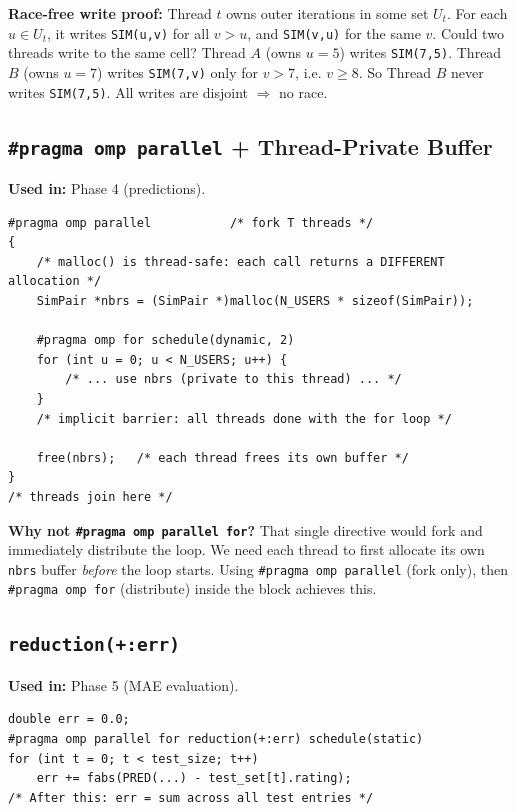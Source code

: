 \documentclass[12pt,a4paper]{article}
\begin{document}
\textbf{Race-free write proof:}  Thread $t$ owns outer iterations in some set
$U_t$.  For each $u \in U_t$, it writes \texttt{SIM(u,v)} for all $v > u$,
and \texttt{SIM(v,u)} for the same $v$.  Could two threads write to the same
cell?  Thread $A$ (owns $u=5$) writes \texttt{SIM(7,5)}.  Thread $B$ (owns
$u=7$) writes \texttt{SIM(7,v)} only for $v > 7$, i.e. $v \geq 8$.  So
Thread $B$ never writes \texttt{SIM(7,5)}.  All writes are disjoint
$\Rightarrow$ no race.

\subsection{\texttt{\#pragma omp parallel} + Thread-Private Buffer}

\textbf{Used in:} Phase 4 (predictions).

\begin{lstlisting}
#pragma omp parallel           /* fork T threads */
{
    /* malloc() is thread-safe: each call returns a DIFFERENT allocation */
    SimPair *nbrs = (SimPair *)malloc(N_USERS * sizeof(SimPair));

    #pragma omp for schedule(dynamic, 2)
    for (int u = 0; u < N_USERS; u++) {
        /* ... use nbrs (private to this thread) ... */
    }
    /* implicit barrier: all threads done with the for loop */

    free(nbrs);   /* each thread frees its own buffer */
}
/* threads join here */
\end{lstlisting}

\textbf{Why not \texttt{\#pragma omp parallel for}?}  That single directive
would fork and immediately distribute the loop.  We need each thread to first
allocate its own \texttt{nbrs} buffer \emph{before} the loop starts.  Using
\texttt{\#pragma omp parallel} (fork only), then \texttt{\#pragma omp for}
(distribute) inside the block achieves this.

\subsection{\texttt{reduction(+:err)}}

\textbf{Used in:} Phase 5 (MAE evaluation).

\begin{lstlisting}
double err = 0.0;
#pragma omp parallel for reduction(+:err) schedule(static)
for (int t = 0; t < test_size; t++)
    err += fabs(PRED(...) - test_set[t].rating);
/* After this: err = sum across all test entries */
\end{lstlisting}
\end{document}
